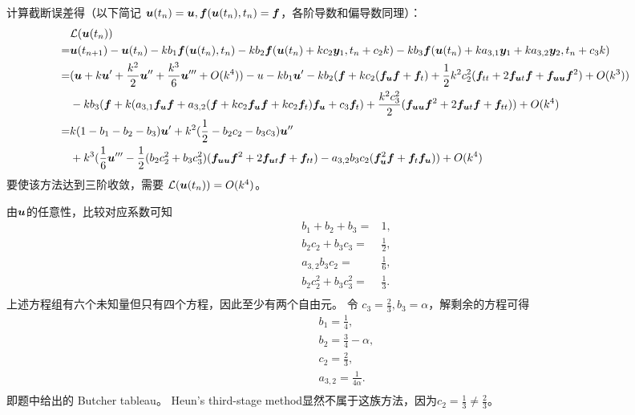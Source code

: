 \documentclass[lang=cn,a4paper,newtx,bibend=bibtex]{elegantpaper}
\begin{document}
\begin{solution}
  计算截断误差得（以下简记 $\bm{u}(t_n) = \bm{u}, \bm{f}(\bm{u}(t_n), t_n) = \bm{f}$，各阶导数和偏导数同理）：
  \begin{equation*}
    \begin{aligned}
      & \mathcal{L}(\bm{u}(t_n)) & \\
      = & \bm{u}(t_{n+1}) - \bm{u}(t_n)
      - kb_1\bm{f}(\bm{u}(t_n), t_n)
      - kb_2\bm{f}(\bm{u}(t_n) + kc_2\bm{y}_1, t_n+c_2k)
      - kb_3\bm{f}(\bm{u}(t_n) + ka_{3,1}\bm{y}_1 + ka_{3,2}\bm{y}_2, t_n+c_3k) & \\
      = & (\bm{u} + k\bm{u}' + \frac{k^2}{2}\bm{u}'' + \frac{k^3}{6}\bm{u}''' + O(k^4)) - u
      - kb_1\bm{u}'
      - kb_2(\bm{f} + kc_2(\bm{f}_{\bm{u}}\bm{f} + \bm{f}_t) + \frac 12 k^2c_2^2(\bm{f}_{tt} + 2\bm{f}_{\bm{u} t}\bm{f} + \bm{f}_{\bm{u}\bm{u}}\bm{f}^2) + O(k^3)) & \\
      & - kb_3(\bm{f} + k(a_{3,1}\bm{f}_{\bm{u}}\bm{f} + a_{3,2}(\bm{f} + kc_2\bm{f}_{\bm{u}}\bm{f} + kc_2\bm{f}_t)\bm{f}_{\bm{u}} + c_3\bm{f}_t) + \frac{k^2c_3^2}2(\bm{f}_{\bm{u}\bm{u}}\bm{f}^2 + 2\bm{f}_{\bm{u} t}\bm{f} + \bm{f}_{tt})) + O(k^4) & \\
      = & k(1 - b_1 - b_2 - b_3)\bm{u}' + k^2(\frac 12 - b_2c_2 - b_3c_3)\bm{u}'' & \\
      & + k^3(\frac 16 \bm{u}''' - \frac 12(b_2c_2^2 + b_3c_3^2)(\bm{f}_{\bm{u}\bm{u}}\bm{f}^2 + 2\bm{f}_{\bm{u} t}\bm{f} + \bm{f}_{tt}) - a_{3,2}b_3c_2(\bm{f}_{\bm{u}}^2\bm{f} + \bm{f}_t\bm{f}_{\bm{u}})) + O(k^4) & \\
    \end{aligned}
  \end{equation*}
  要使该方法达到三阶收敛，需要 $\mathcal{L}(\bm{u}(t_n)) = O(k^4)$。

  由$\bm{u}$的任意性，比较对应系数可知
  \begin{equation*}
    \begin{aligned}
      b_1 + b_2 + b_3 = & 1, & \\
      b_2c_2 + b_3c_3 = & \frac 12, & \\
      a_{3,2}b_3c_2 = & \frac 16, & \\
      b_2c_2^2 + b_3c_3^2 = & \frac 13. & \\
    \end{aligned}
  \end{equation*}
  上述方程组有六个未知量但只有四个方程，因此至少有两个自由元。
  令 $c_3 = \frac 23, b_3 = \alpha$，解剩余的方程可得
  \begin{equation*}
    \begin{aligned}
      b_1 = \frac 14, & \\
      b_2 = \frac 34 - \alpha, & \\
      c_2 = \frac 23, & \\
      a_{3,2} = \frac 1{4\alpha}. & \\        
    \end{aligned}
  \end{equation*}
  即题中给出的 Butcher tableau。
  Heun's third-stage method显然不属于这族方法，因为$c_2 = \frac 13 \neq \frac 23$。
\end{solution}
\end{document}
